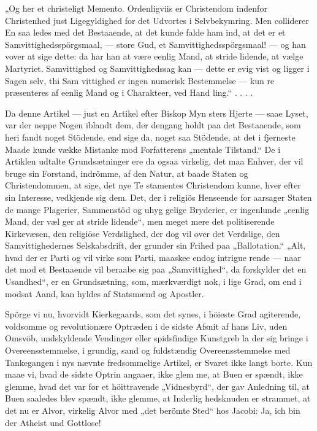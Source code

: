 \documentclass[12pt,a4paper]{article}
\newcommand{\opage}[1]{\marginnote{\footnotesize\textit{[#1]}}}
\begin{document}
„Og her et christeligt Memento. Ordenligviis er
Christendom indenfor Christenhed just Ligegyldighed for
det Udvortes i Selvbekymring. Men colliderer En saa\-%
ledes med det Bestaaende, at det kunde falde ham ind,
at det er et Samvittighedsspörgsmaal, --- store Gud, et
Samvittighedsspörgsmaal! --- og han vover at sige dette:
da har han at være eenlig Mand, at stride lidende, at
vælge Martyriet. Samvittighed og Samvittighedssag kan
--- dette er evig vist og ligger i Sagen selv, thi Sam\-%
vittighed er ingen numerisk Bestemmelse --- kun re\-%
præsenteres af eenlig Mand og i Charakteer, ved Hand\-%
ling.“ . . . .

Da denne Artikel --- just en Artikel efter Biskop Myn\-%
sters Hjerte --- saae Lyset, var der neppe Nogen iblandt
dem, der dengang holdt paa det Bestaaende, som heri
fandt noget Stödende, end sige da, noget saa Stödende,
at det i fjerneste Maade kunde vække Mistanke mod
Forfatterens „mentale Tilstand.“ De i Artiklen udtalte
Grundsætninger ere da ogsaa virkelig, det maa Enhver,
der vil bruge sin Forstand, indrömme, af den Natur, at
baade Staten og Christendommen, at sige, det nye Te\-%
stamentes Christendom kunne, hver efter sin Interesse,
vedkjende sig dem. Det, der i religiös Henseende for\-%
aarsager Staten de mange Plagerier, Sammenstöd og uhyg\-%
gelige Bryderier, er ingenlunde „eenlig Mand, der væl\-%
ger at stride lidende“, men meget mere det politiserende
Kirkevæsen, den religiöse Verdslighed, der dog vil over
det Verdslige, den Samvittighedernes Selskabsdrift, der
grunder sin Frihed paa „Ballotation.“ „Alt, hvad der
er Parti og vil virke som Parti, maaskee endog intrigue\-%
rende --- naar det mod et Bestaaende vil beraabe sig
paa „Samvittighed“, da forskylder det en Usandhed“, er
en Grundsætning, som, mærkværdigt nok, i lige Grad, om
end i modsat Aand, kan hyldes af Statsmænd og Apostler.

\opage{25} Spörge vi nu, hvorvidt Kierkegaards, som det synes,
i höieste Grad agiterende, voldsomme og revolutionære
Optræden i de sidste Afsnit af hans Liv, uden Omsvöb,
undskyldende Vendinger eller spidsfindige Kunstgreb la\-%
der sig bringe i Overeensstemmelse, i grundig, sand og
fuldstændig Overeensstemmelse med Tankegangen i nys\-%
nævnte fredsommelige Artikel, er Svaret ikke langt borte.
Kun maae vi, hvad de sidste Optrin angaaer, ikke glem\-%
me, at Buen er spændt, ikke glemme, hvad det var for
et höittravende „Vidnesbyrd“, der gav Anledning til, at
Buen saaledes blev spændt, ikke glemme, at Inderlig\-%
hedsknuden er strammet, at det nu er Alvor, virkelig
Alvor med „det berömte Sted“ hos Jacobi: Ja, ich bin
der Atheist und Gottlose!
\end{document}
